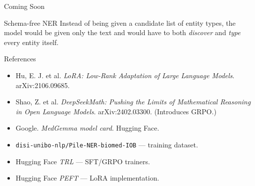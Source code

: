 \begin{frame}{Coming Soon}
  \begin{block}{Schema-free NER}
    Instead of being given a candidate list of entity types, the model would be given only the text and would have to both \emph{discover} and \emph{type} every entity itself.
  \end{block}
\end{frame}

\begin{frame}{References}
  \begin{itemize}
    \item Hu, E. J. et al. \emph{LoRA: Low-Rank Adaptation of Large Language Models}. arXiv:2106.09685.
    \item Shao, Z. et al. \emph{DeepSeekMath: Pushing the Limits of Mathematical Reasoning in Open Language Models}. arXiv:2402.03300. (Introduces GRPO.)
    \item Google. \emph{MedGemma model card}. Hugging Face.
    \item \texttt{disi-unibo-nlp/Pile-NER-biomed-IOB} --- training dataset.
    \item Hugging Face \emph{TRL} --- SFT/GRPO trainers.
    \item Hugging Face \emph{PEFT} --- LoRA implementation.
  \end{itemize}
\end{frame}
